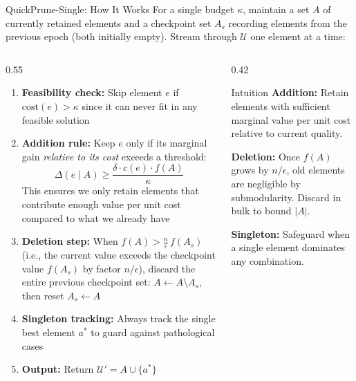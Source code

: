 \documentclass[aspectratio=169,xcolor=dvipsnames,8pt]{beamer}
\begin{document}
\begin{frame}{QuickPrune-Single: How It Works}
  For a single budget $\kappa$, maintain a set $A$ of currently retained elements and a checkpoint set $A_s$ recording elements from the previous epoch (both initially empty). Stream through $\mathcal{U}$ one element at a time:

  \vspace{0.2cm}

  \begin{columns}
    \begin{column}{0.55\textwidth}
      \begin{enumerate}
        \item \textbf{Feasibility check:} Skip element $e$ if $\text{cost}(e) > \kappa$
          since it can never fit in any feasible solution

        \item \textbf{Addition rule:} Keep $e$ only if its marginal gain
          \emph{relative to its cost} exceeds a threshold:
          \[
            \Delta(e \mid A) \geq \frac{\delta \cdot c(e) \cdot f(A)}{\kappa}
          \]
          This ensures we only retain elements that contribute enough
          value per unit cost compared to what we already have

        \item \textbf{Deletion step:} When $f(A) > \frac{n}{\epsilon}\, f(A_s)$
          (i.e., the current value exceeds the checkpoint value $f(A_s)$ by factor
          $n/\epsilon$), discard the entire previous checkpoint set:
          $A \gets A \setminus A_s$, then reset $A_s \gets A$

        \item \textbf{Singleton tracking:} Always track the single best element $a^*$
          to guard against pathological cases

        \item \textbf{Output:} Return $\mathcal{U}' = A \cup \{a^*\}$
      \end{enumerate}
    \end{column}
    \begin{column}{0.42\textwidth}
      \begin{exampleblock}{Intuition}
        \textbf{Addition:} Retain elements with sufficient marginal value per unit cost relative to current quality.

        \vspace{0.15cm}

        \textbf{Deletion:} Once $f(A)$ grows by $n/\epsilon$, old elements are negligible by submodularity. Discard in bulk to bound $|A|$.

        \vspace{0.15cm}

        \textbf{Singleton:} Safeguard when a single element dominates any combination.
      \end{exampleblock}
    \end{column}
  \end{columns}
\end{frame}
\end{document}

